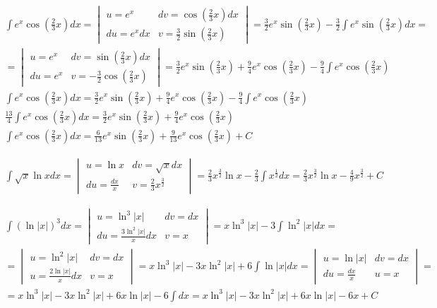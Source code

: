 \begin{gather*}
  \int e^x\cos (\tfrac{2}{3}x)dx =
  \begin{vmatrix}
    u=e^x & dv=\cos(\tfrac{2}{3}x)dx \\
    du=e^x dx & v=\frac{3}{2}\sin (\tfrac{2}{3}x)
  \end{vmatrix}
  = \frac{3}{2}e^x\sin (\tfrac{2}{3}x) - \frac{3}{2} \int e^x\sin (\tfrac{2}{3}x)dx = \\
  = \begin{vmatrix}
    u=e^x & dv=\sin (\tfrac{2}{3}x)dx \\
    du=e^x & v=-\frac{3}{2}\cos(\tfrac{2}{3}x)
  \end{vmatrix}
  = \frac{3}{2}e^x\sin (\tfrac{2}{3}x) + \frac{9}{4}e^x\cos(\tfrac{2}{3}x) - \frac{9}{4}\int e^x\cos(\tfrac{2}{3}x) \\
  \int e^x\cos (\tfrac{2}{3}x)dx = \frac{3}{2}e^x\sin (\tfrac{2}{3}x) + \frac{9}{4}e^x\cos(\tfrac{2}{3}x) - \frac{9}{4}\int e^x\cos(\tfrac{2}{3}x) \\
  \frac{13}{4}\int e^x\cos (\tfrac{2}{3}x)dx = \frac{3}{2}e^x\sin (\tfrac{2}{3}x) + \frac{9}{4}e^x\cos(\tfrac{2}{3}x) \\
  \int e^x\cos (\tfrac{2}{3}x)dx = \frac{6}{13}e^x\sin (\tfrac{2}{3}x) + \frac{9}{13}e^x\cos(\tfrac{2}{3}x) + C
\end{gather*}



\begin{gather*}
  \int \sqrt{x}\ln x dx =
  \begin{vmatrix}
    u=\ln x & dv=\sqrt{x}dx \\
    du=\frac{dx}{x} & v=\frac{2}{3}x^{\frac{3}{2}}
  \end{vmatrix}
  = \frac{2}{3}x^{\frac{3}{2}}\ln x - \frac{2}{3} \int x^{\frac{1}{2}}dx
  = \frac{2}{3}x^{\frac{3}{2}}\ln x - \frac{4}{9} x^{\frac{3}{2}}+C
\end{gather*}



\begin{gather*}
  \int (\ln|x|)^3 dx =
  \begin{vmatrix}
    u=\ln^3|x| & dv=dx \\
    du=\frac{3\ln^2|x|}{x}dx & v=x
  \end{vmatrix}
  = x\ln^3|x| - 3\int \ln^2|x|dx = \\
  = \begin{vmatrix}
    u= \ln^2|x| & dv=dx \\
    u=\frac{2\ln|x|}{x}dx & v=x
  \end{vmatrix}
  = x\ln^3|x| - 3x\ln^2|x| + 6\int \ln|x|dx =
  \begin{vmatrix}
    u=\ln|x| & dv=dx \\
    du=\frac{dx}{x} & u=x
  \end{vmatrix} = \\
  = x\ln^3|x| - 3x\ln^2|x| + 6x\ln|x| - 6\int dx
  = x\ln^3|x| - 3x\ln^2|x| + 6x\ln|x| - 6x + C
\end{gather*}



